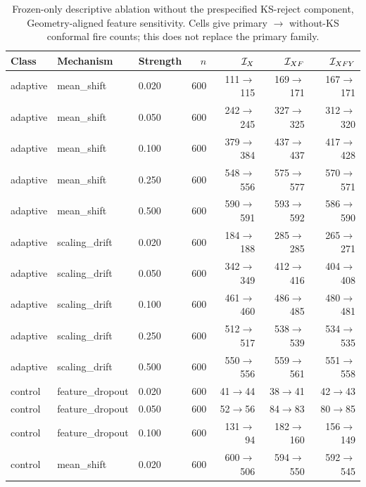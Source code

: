 \begin{table}[!t]
\caption{Frozen-only descriptive ablation without the prespecified KS-reject component, Geometry-aligned feature sensitivity. Cells give primary $\rightarrow$ without-KS conformal fire counts; this does not replace the primary family.}
\label{tab:v137-without-ks-2}
\centering\footnotesize\renewcommand{\arraystretch}{0.90}\setlength{\tabcolsep}{4pt}
\begin{tabular}{@{}lllrrrr@{}}
\toprule
Class & Mechanism & Strength & $n$ & $\mathcal I_X$ & $\mathcal I_{XF}$ & $\mathcal I_{XFY}$ \\
\midrule
adaptive & mean\_shift & 0.020 & 600 & 111$\rightarrow$115 & 169$\rightarrow$171 & 167$\rightarrow$171 \\
adaptive & mean\_shift & 0.050 & 600 & 242$\rightarrow$245 & 327$\rightarrow$325 & 312$\rightarrow$320 \\
adaptive & mean\_shift & 0.100 & 600 & 379$\rightarrow$384 & 437$\rightarrow$437 & 417$\rightarrow$428 \\
adaptive & mean\_shift & 0.250 & 600 & 548$\rightarrow$556 & 575$\rightarrow$577 & 570$\rightarrow$571 \\
adaptive & mean\_shift & 0.500 & 600 & 590$\rightarrow$591 & 593$\rightarrow$592 & 586$\rightarrow$590 \\
adaptive & scaling\_drift & 0.020 & 600 & 184$\rightarrow$188 & 285$\rightarrow$285 & 265$\rightarrow$271 \\
adaptive & scaling\_drift & 0.050 & 600 & 342$\rightarrow$349 & 412$\rightarrow$416 & 404$\rightarrow$408 \\
adaptive & scaling\_drift & 0.100 & 600 & 461$\rightarrow$460 & 486$\rightarrow$485 & 480$\rightarrow$481 \\
adaptive & scaling\_drift & 0.250 & 600 & 512$\rightarrow$517 & 538$\rightarrow$539 & 534$\rightarrow$535 \\
adaptive & scaling\_drift & 0.500 & 600 & 550$\rightarrow$556 & 559$\rightarrow$561 & 551$\rightarrow$558 \\
control & feature\_dropout & 0.020 & 600 & 41$\rightarrow$44 & 38$\rightarrow$41 & 42$\rightarrow$43 \\
control & feature\_dropout & 0.050 & 600 & 52$\rightarrow$56 & 84$\rightarrow$83 & 80$\rightarrow$85 \\
control & feature\_dropout & 0.100 & 600 & 131$\rightarrow$94 & 182$\rightarrow$160 & 156$\rightarrow$149 \\
control & mean\_shift & 0.020 & 600 & 600$\rightarrow$506 & 594$\rightarrow$550 & 592$\rightarrow$545 \\

\end{tabular}
\end{table}
